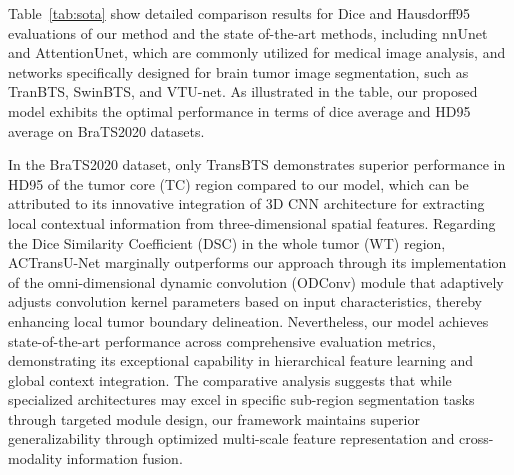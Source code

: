 \documentclass[AMA,Times1COL]{WileyNJDv5} %
\begin{document}

Table~\ref{tab:sota} show detailed comparison results for Dice and Hausdorff95 evaluations of our method and the state of-the-art methods, including nnUnet and AttentionUnet, which are commonly utilized for medical image analysis, and networks specifically designed for brain tumor image segmentation, such as TranBTS, SwinBTS, and VTU-net. As illustrated in the table, our proposed model exhibits the optimal performance in terms of dice average and HD95 average on BraTS2020 datasets.

In the BraTS2020 dataset, only TransBTS demonstrates superior performance in HD95 of the tumor core (TC) region compared to our model, which can be attributed to its innovative integration of 3D CNN architecture for extracting local contextual information from three-dimensional spatial features. Regarding the Dice Similarity Coefficient (DSC) in the whole tumor (WT) region, ACTransU-Net marginally outperforms our approach through its implementation of the omni-dimensional dynamic convolution (ODConv) module that adaptively adjusts convolution kernel parameters based on input characteristics, thereby enhancing local tumor boundary delineation. Nevertheless, our model achieves state-of-the-art performance across comprehensive evaluation metrics, demonstrating its exceptional capability in hierarchical feature learning and global context integration. The comparative analysis suggests that while specialized architectures may excel in specific sub-region segmentation tasks through targeted module design, our framework maintains superior generalizability through optimized multi-scale feature representation and cross-modality information fusion.
\end{document}
